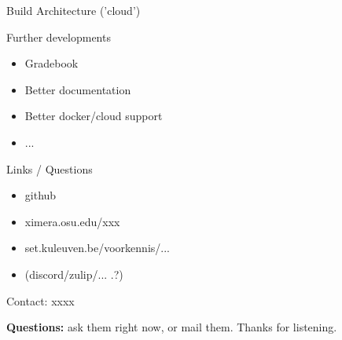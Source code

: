 \begin{frame}[t]{Build Architecture ('cloud')}
\begin{center}
{
  }
\end{center}
\end{frame}

\begin{frame}{Further developments}

  \begin{itemize}
  \item Gradebook
  \item Better documentation
  \item Better docker/cloud support
  \item ...
  \end{itemize}

\end{frame}

\begin{frame}[t]{Links / Questions}

  \vfill
  \begin{itemize}
  \item github
  \item ximera.osu.edu/xxx
  \item set.kuleuven.be/voorkennis/...
  \item (discord/zulip/... .?)
  \end{itemize}
  \vfill

  Contact: xxxx

  \vfill
  \textbf{\Large Questions:} ask them right now, or mail them.
  \vfill
  Thanks for listening.

\end{frame}


